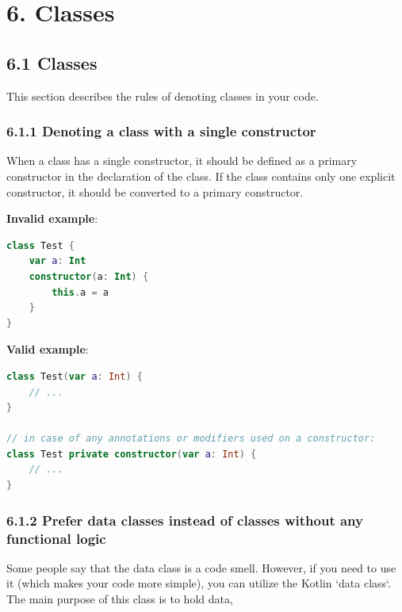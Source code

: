 {{{{\section*{\textbf{6. Classes}}

\label{sec:6.}

\subsection*{\textbf{6.1 Classes}}

\label{sec:6.1}

This section describes the rules of denoting classes in your code.

\subsubsection*{\textbf{6.1.1  Denoting a class with a single constructor}}
\leavevmode\newline

\label{sec:6.1.1}

When a class has a single constructor, it should be defined as a primary constructor in the declaration of the class. If the class contains only one explicit constructor, it should be converted to a primary constructor.



\textbf{Invalid example}:

\begin{lstlisting}[language=Kotlin]
class Test {
    var a: Int
    constructor(a: Int) {
        this.a = a
    }
}
\end{lstlisting}


\textbf{Valid example}:

\begin{lstlisting}[language=Kotlin]
class Test(var a: Int) { 
    // ...
}

// in case of any annotations or modifiers used on a constructor:
class Test private constructor(var a: Int) { 
    // ...
}
\end{lstlisting}


\subsubsection*{\textbf{6.1.2 Prefer data classes instead of classes without any functional logic}}
\leavevmode\newline

\label{sec:6.1.2}

Some people say that the data class is a code smell. However, if you need to use it (which makes your code more simple), you can utilize the Kotlin `data class`. The main purpose of this class is to hold data,

}}}}
